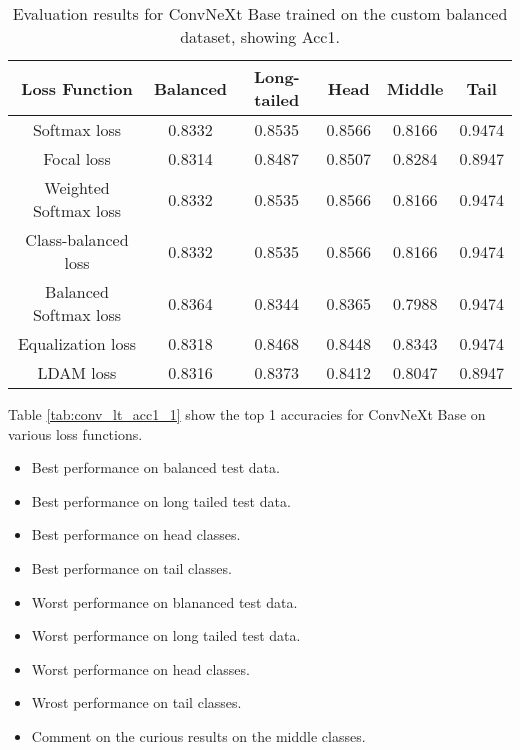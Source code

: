 \begin{table}[h!]
    \centering
    \begin{tabular}{cccccc}
        \toprule
        Loss Function & Balanced & Long-tailed & Head & Middle & Tail \\ 
        \midrule
        Softmax loss   & 0.8332 & 0.8535 & 0.8566 & 0.8166 & 0.9474 \\
        Focal loss   & 0.8314 & 0.8487 & 0.8507 & 0.8284 & 0.8947 \\
        Weighted Softmax loss   & 0.8332 & 0.8535 & 0.8566 &  0.8166 & 0.9474 \\
        Class-balanced loss   & 0.8332 & 0.8535 & 0.8566 & 0.8166 & 0.9474 \\
        Balanced Softmax loss   & 0.8364 & 0.8344 & 0.8365 & 0.7988 & 0.9474 \\
        Equalization loss   & 0.8318 & 0.8468 & 0.8448 & 0.8343 & 0.9474 \\
        LDAM loss   & 0.8316 & 0.8373 & 0.8412 & 0.8047 & 0.8947 \\
        \bottomrule
    \end{tabular}
    \caption{Evaluation results for ConvNeXt Base trained on the custom balanced dataset, showing Acc1.}
    \label{tab:conv_bal_acc1_1}
\end{table}

Table \ref{tab:conv_lt_acc1_1} show the top 1 accuracies for ConvNeXt Base on various loss functions.

\begin{itemize}
    \item Best performance on balanced test data.
    \item Best performance on long tailed test data.
    \item Best performance on head classes.
    \item Best performance on tail classes.
    \item Worst performance on blananced test data.
    \item Worst performance on long tailed test data.
    \item Worst performance on head classes.
    \item Wrost performance on tail classes.
    \item Comment on the curious results on the middle classes.
\end{itemize}

